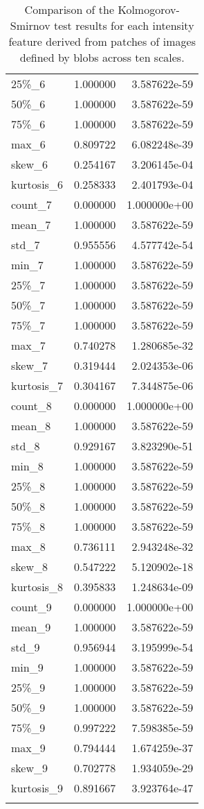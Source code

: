 \begin{center}
\begin{longtable}{lrr}
25\%\_6      &  1.000000 &  3.587622e-59 \\
50\%\_6      &  1.000000 &  3.587622e-59 \\
75\%\_6      &  1.000000 &  3.587622e-59 \\
max\_6      &  0.809722 &  6.082248e-39 \\
skew\_6     &  0.254167 &  3.206145e-04 \\
kurtosis\_6 &  0.258333 &  2.401793e-04 \\
count\_7    &  0.000000 &  1.000000e+00 \\
mean\_7     &  1.000000 &  3.587622e-59 \\
std\_7      &  0.955556 &  4.577742e-54 \\
min\_7      &  1.000000 &  3.587622e-59 \\
25\%\_7      &  1.000000 &  3.587622e-59 \\
50\%\_7      &  1.000000 &  3.587622e-59 \\
75\%\_7      &  1.000000 &  3.587622e-59 \\
max\_7      &  0.740278 &  1.280685e-32 \\
skew\_7     &  0.319444 &  2.024353e-06 \\
kurtosis\_7 &  0.304167 &  7.344875e-06 \\
count\_8    &  0.000000 &  1.000000e+00 \\
mean\_8     &  1.000000 &  3.587622e-59 \\
std\_8      &  0.929167 &  3.823290e-51 \\
min\_8      &  1.000000 &  3.587622e-59 \\
25\%\_8      &  1.000000 &  3.587622e-59 \\
50\%\_8      &  1.000000 &  3.587622e-59 \\
75\%\_8      &  1.000000 &  3.587622e-59 \\
max\_8      &  0.736111 &  2.943248e-32 \\
skew\_8     &  0.547222 &  5.120902e-18 \\
kurtosis\_8 &  0.395833 &  1.248634e-09 \\
count\_9    &  0.000000 &  1.000000e+00 \\
mean\_9     &  1.000000 &  3.587622e-59 \\
std\_9      &  0.956944 &  3.195999e-54 \\
min\_9      &  1.000000 &  3.587622e-59 \\
25\%\_9      &  1.000000 &  3.587622e-59 \\
50\%\_9      &  1.000000 &  3.587622e-59 \\
75\%\_9      &  0.997222 &  7.598385e-59 \\
max\_9      &  0.794444 &  1.674259e-37 \\
skew\_9     &  0.702778 &  1.934059e-29 \\
kurtosis\_9 &  0.891667 &  3.923764e-47 \\

\caption{Comparison of the Kolmogorov-Smirnov test results for each intensity feature derived from patches of images defined by blobs across ten scales.}
\end{longtable}	
\end{center}


